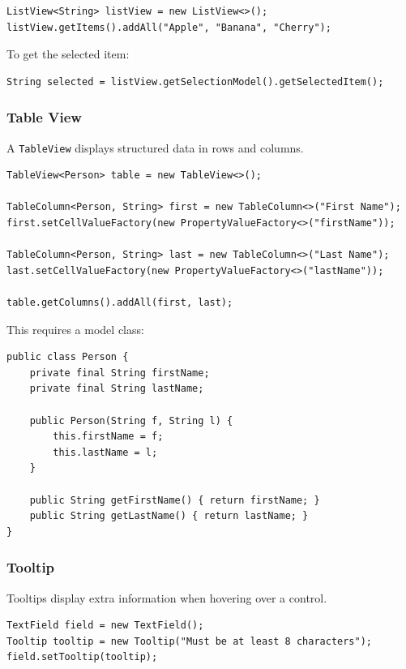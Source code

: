 \documentclass{article}
\newcommand{\codecmd}[1]{\textcolor[rgb]{0,0.5,0}{\texttt{#1}}}
\begin{document}
\begin{verbatim}
ListView<String> listView = new ListView<>();
listView.getItems().addAll("Apple", "Banana", "Cherry");
\end{verbatim}

\noindent To get the selected item:
\begin{verbatim}
String selected = listView.getSelectionModel().getSelectedItem();
\end{verbatim}

\subsubsection{Table View}

A \codecmd{TableView} displays structured data in rows and columns.

\begin{verbatim}
TableView<Person> table = new TableView<>();

TableColumn<Person, String> first = new TableColumn<>("First Name");
first.setCellValueFactory(new PropertyValueFactory<>("firstName"));

TableColumn<Person, String> last = new TableColumn<>("Last Name");
last.setCellValueFactory(new PropertyValueFactory<>("lastName"));

table.getColumns().addAll(first, last);
\end{verbatim}

\noindent This requires a model class:
\begin{verbatim}
public class Person {
    private final String firstName;
    private final String lastName;

    public Person(String f, String l) {
        this.firstName = f;
        this.lastName = l;
    }

    public String getFirstName() { return firstName; }
    public String getLastName() { return lastName; }
}
\end{verbatim}

\subsubsection{Tooltip}

Tooltips display extra information when hovering over a control.

\begin{verbatim}
TextField field = new TextField();
Tooltip tooltip = new Tooltip("Must be at least 8 characters");
field.setTooltip(tooltip);
\end{verbatim}
\end{document}

